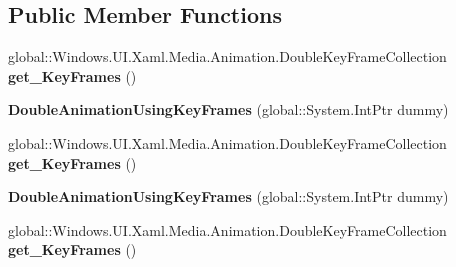 \subsection*{Public Member Functions}
\begin{DoxyCompactItemize}
\item 
\mbox{\label{class_windows_1_1_u_i_1_1_xaml_1_1_media_1_1_animation_1_1_double_animation_using_key_frames_a8b2144bad411b6eacce9e055ef1e6a97}} 
global\+::\+Windows.\+U\+I.\+Xaml.\+Media.\+Animation.\+Double\+Key\+Frame\+Collection {\bfseries get\+\_\+\+Key\+Frames} ()
\item 
\mbox{\label{class_windows_1_1_u_i_1_1_xaml_1_1_media_1_1_animation_1_1_double_animation_using_key_frames_a0ed120d45bdb1f96c1a8013083b38af5}} 
{\bfseries Double\+Animation\+Using\+Key\+Frames} (global\+::\+System.\+Int\+Ptr dummy)
\item 
\mbox{\label{class_windows_1_1_u_i_1_1_xaml_1_1_media_1_1_animation_1_1_double_animation_using_key_frames_a8b2144bad411b6eacce9e055ef1e6a97}} 
global\+::\+Windows.\+U\+I.\+Xaml.\+Media.\+Animation.\+Double\+Key\+Frame\+Collection {\bfseries get\+\_\+\+Key\+Frames} ()
\item 
\mbox{\label{class_windows_1_1_u_i_1_1_xaml_1_1_media_1_1_animation_1_1_double_animation_using_key_frames_a0ed120d45bdb1f96c1a8013083b38af5}} 
{\bfseries Double\+Animation\+Using\+Key\+Frames} (global\+::\+System.\+Int\+Ptr dummy)
\item 
\mbox{\label{class_windows_1_1_u_i_1_1_xaml_1_1_media_1_1_animation_1_1_double_animation_using_key_frames_a8b2144bad411b6eacce9e055ef1e6a97}} 
global\+::\+Windows.\+U\+I.\+Xaml.\+Media.\+Animation.\+Double\+Key\+Frame\+Collection {\bfseries get\+\_\+\+Key\+Frames} ()
\item 
\mbox{\label{class_windows_1_1_u_i_1_1_xaml_1_1_media_1_1_animation_1_1_double_animation_using_key_frames_a0ed120d45bdb1f96c1a8013083b38af5}} 

\end{DoxyCompactItemize}
